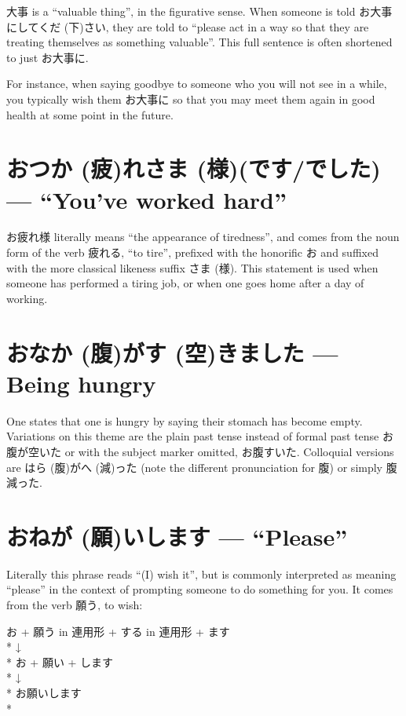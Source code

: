 \documentclass[11pt, b5paper, twoside, openright, onecolumn]{book}
\makeatletter
\newcommand*{\rubystack}[2]{{\relscale{0.5}%
  \begin{tabular}[b]{@{}c@{}}%
    {#1}\\%
   {\textscale{2}{#2}}%
  \end{tabular}}%
}
\DeclareRobustCommand*{\ruby}[2]{%
  \mbox{%
    \setlength{\parskip}{0ex}%
    \BeginAccSupp{method=pdfstringdef,ActualText={#1}}%
      \rubystack{\phantom{#2}}{#1}%
      \llap{%
        \rubystack{#2}{\phantom{#1}}%
      }%
    \EndAccSupp{}%
  }%
}
\renewcommand*{\ruby}[2]{#2 (#1)}%
\newenvironment{exampleblock}{
\setlength{\parindent}{0.6in}
\begin{minipage}[t]{\dimexpr\textwidth-\parindent}}
{\end{minipage}}
\makeatother
\begin{document}
大事 is a “valuable thing”‚ in the figurative sense. When someone is told お大事にして\ruby{下}{くだ}さい‚ they are told to “please act in a way so that they are treating themselves as something valuable”. This full sentence is often shortened to just お大事に.

For instance‚ when saying goodbye to someone who you will not see in a while‚ you typically wish them お大事に so that you may meet them again in good health at some point in the future.

\section*{お\ruby{疲}{つか}れ\ruby{様}{さま}(です/でした) — “You’ve worked hard”}

お疲れ様 literally means “the appearance of tiredness”‚ and comes from the noun form of the verb 疲れる‚ “to tire”‚ prefixed with the honorific お and suffixed with the more classical likeness suffix \ruby{様}{さま}. This statement is used when someone has performed a tiring job‚ or when one goes home after a day of working.

\section*{お\ruby{腹}{なか}が\ruby{空}{す}きました — Being hungry}

One states that one is hungry by saying their stomach has become empty. Variations on this theme are the plain past tense instead of formal past tense お腹が空いた or with the subject marker omitted‚ お腹すいた. Colloquial versions are \ruby{腹}{はら}が\ruby{減}{へ}った (note the different pronunciation for 腹) or simply 腹減った.

\section*{お\ruby{願}{ねが}いします — “Please”}

Literally this phrase reads “(I) wish it”‚ but is commonly interpreted as meaning “please” in the context of prompting someone to do something for you. It comes from the verb 願う‚ to wish:

\vspace{0.4cm}
\begin{exampleblock}
お + 願う in 連用形 + する in 連用形 + ます \\* 
↓ \\* 
お + 願い + します \\* 
↓ \\* 
お願いします \\* 
\end{exampleblock}
\end{document}
